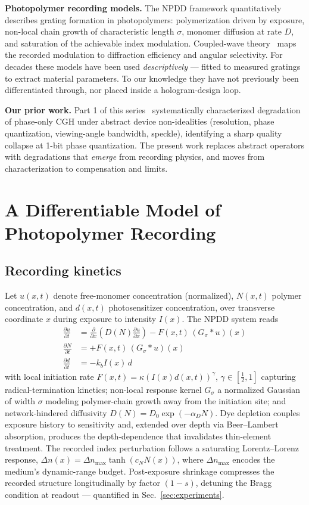 \documentclass[conference]{IEEEtran}
\begin{document}
\textbf{Photopolymer recording models.} The NPDD framework quantitatively
describes grating formation in photopolymers: polymerization driven by
exposure, non-local chain growth of characteristic length $\sigma$, monomer
diffusion at rate $D$, and saturation of the achievable index modulation.
Coupled-wave theory~\cite{kogelnik1969coupled} maps the recorded modulation to
diffraction efficiency and angular selectivity. For decades these models have
been used \emph{descriptively} — fitted to measured gratings to extract
material parameters. To our knowledge they have not previously been
differentiated through, nor placed inside a hologram-design loop.

\textbf{Our prior work.} Part 1 of this series~\cite{tripathi2025holoforge}
systematically characterized degradation of phase-only CGH under abstract
device non-idealities (resolution, phase quantization, viewing-angle
bandwidth, speckle), identifying a sharp quality collapse at 1-bit phase
quantization. The present work replaces abstract operators with degradations
that \emph{emerge} from recording physics, and moves from characterization to
compensation and limits.

\section{A Differentiable Model of Photopolymer Recording}
\label{sec:twin}

\subsection{Recording kinetics}
Let $u(x,t)$ denote free-monomer concentration (normalized), $N(x,t)$
polymer concentration, and $d(x,t)$ photosensitizer concentration, over
transverse coordinate $x$ during exposure to intensity $I(x)$. The NPDD
system reads
\begin{align}
\frac{\partial u}{\partial t} &= \frac{\partial}{\partial x}\!\left(D(N)\frac{\partial u}{\partial x}\right) - F(x,t)\,(G_\sigma * u)(x) \\
\frac{\partial N}{\partial t} &= + F(x,t)\,(G_\sigma * u)(x) \\
\frac{\partial d}{\partial t} &= - k_b I(x)\, d
\end{align}
with local initiation rate $F(x,t) = \kappa (I(x) d(x,t))^\gamma$,
$\gamma \in [\tfrac12,1]$ capturing radical-termination kinetics; non-local
response kernel $G_\sigma$ a normalized Gaussian of width $\sigma$ modeling
polymer-chain growth away from the initiation site; and network-hindered
diffusivity $D(N) = D_0 \exp(-\alpha_D N)$. Dye depletion couples exposure
history to sensitivity and, extended over depth via Beer--Lambert absorption,
produces the depth-dependence that invalidates thin-element treatment. The
recorded index perturbation follows a saturating Lorentz--Lorenz response,
$\Delta n(x) = \Delta n_{\max}\tanh(c_N N(x))$, where $\Delta n_{\max}$
encodes the medium's dynamic-range budget. Post-exposure shrinkage compresses
the recorded structure longitudinally by factor $(1-s)$, detuning the Bragg
condition at readout — quantified in Sec.~\ref{sec:experiments}.
\end{document}
